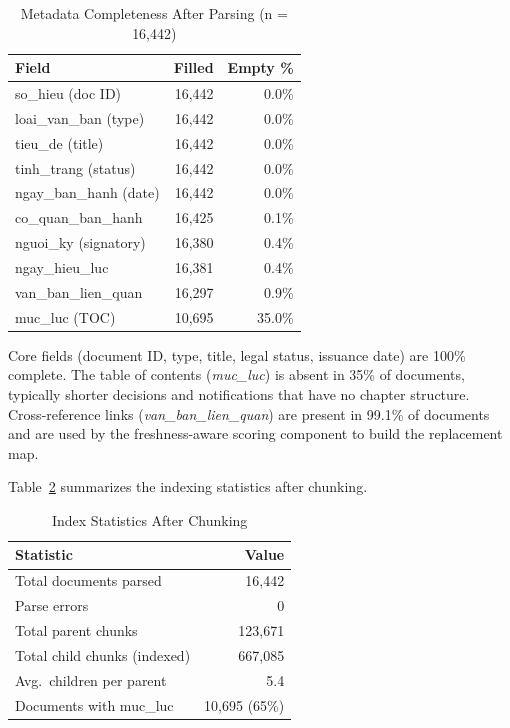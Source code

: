 \documentclass[conference]{IEEEtran}
\begin{document}
\begin{table}[h]
\caption{Metadata Completeness After Parsing (n = 16,442)}
\label{tab:parse}
\centering
\begin{tabular}{lrr}
\toprule
\textbf{Field} & \textbf{Filled} & \textbf{Empty \%} \\
\midrule
so\_hieu (doc ID)       & 16,442 & 0.0\% \\
loai\_van\_ban (type)   & 16,442 & 0.0\% \\
tieu\_de (title)        & 16,442 & 0.0\% \\
tinh\_trang (status)    & 16,442 & 0.0\% \\
ngay\_ban\_hanh (date)  & 16,442 & 0.0\% \\
co\_quan\_ban\_hanh     & 16,425 & 0.1\% \\
nguoi\_ky (signatory)   & 16,380 & 0.4\% \\
ngay\_hieu\_luc         & 16,381 & 0.4\% \\
van\_ban\_lien\_quan    & 16,297 & 0.9\% \\
muc\_luc (TOC)          & 10,695 & 35.0\% \\
\bottomrule
\end{tabular}
\end{table}

Core fields (document ID, type, title, legal status, issuance date) are
100\% complete. The table of contents (\emph{muc\_luc}) is absent in 35\%
of documents, typically shorter decisions and notifications that have no
chapter structure. Cross-reference links (\emph{van\_ban\_lien\_quan}) are
present in 99.1\% of documents and are used by the freshness-aware scoring
component to build the replacement map.

Table~\ref{tab:corpus} summarizes the indexing statistics after chunking.

\begin{table}[h]
\caption{Index Statistics After Chunking}
\label{tab:corpus}
\centering
\begin{tabular}{lr}
\toprule
\textbf{Statistic} & \textbf{Value} \\
\midrule
Total documents parsed    & 16,442 \\
Parse errors              & 0 \\
Total parent chunks       & 123,671 \\
Total child chunks (indexed) & 667,085 \\
Avg.\ children per parent & 5.4 \\
Documents with muc\_luc   & 10,695 (65\%) \\
\bottomrule
\end{tabular}
\end{table}
\end{document}

